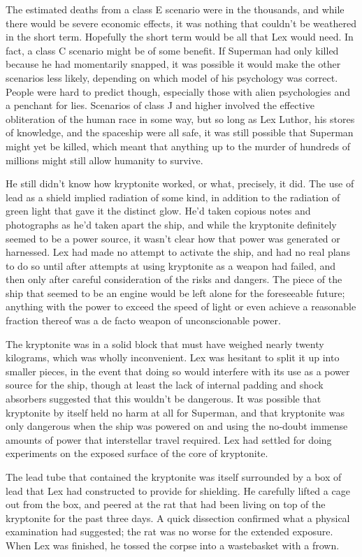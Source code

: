 The estimated deaths from a class E scenario were in the thousands, and
while there would be severe economic effects, it was nothing that
couldn't be weathered in the short term. Hopefully the short term would
be all that Lex would need. In fact, a class C scenario might be of some
benefit. If Superman had only killed because he had momentarily snapped,
it was possible it would make the other scenarios less likely, depending
on which model of his psychology was correct. People were hard to
predict though, especially those with alien psychologies and a penchant
for lies. Scenarios of class J and higher involved the effective
obliteration of the human race in some way, but so long as Lex Luthor,
his stores of knowledge, and the spaceship were all safe, it was still
possible that Superman might yet be killed, which meant that anything up
to the murder of hundreds of millions might still allow humanity to
survive.

He still didn't know how kryptonite worked, or what, precisely, it did.
The use of lead as a shield implied radiation of some kind, in addition
to the radiation of green light that gave it the distinct glow. He'd
taken copious notes and photographs as he'd taken apart the ship, and
while the kryptonite definitely seemed to be a power source, it wasn't
clear how that power was generated or harnessed. Lex had made no attempt
to activate the ship, and had no real plans to do so until after
attempts at using kryptonite as a weapon had failed, and then only after
careful consideration of the risks and dangers. The piece of the ship
that seemed to be an engine would be left alone for the foreseeable
future; anything with the power to exceed the speed of light or even
achieve a reasonable fraction thereof was a de facto weapon of
unconscionable power.

The kryptonite was in a solid block that must have weighed nearly twenty
kilograms, which was wholly inconvenient. Lex was hesitant to split it
up into smaller pieces, in the event that doing so would interfere with
its use as a power source for the ship, though at least the lack of
internal padding and shock absorbers suggested that this wouldn't be
dangerous. It was possible that kryptonite by itself held no harm at all
for Superman, and that kryptonite was only dangerous when the ship was
powered on and using the no‐doubt immense amounts of power that
interstellar travel required. Lex had settled for doing experiments on
the exposed surface of the core of kryptonite.

The lead tube that contained the kryptonite was itself surrounded by a
box of lead that Lex had constructed to provide for shielding. He
carefully lifted a cage out from the box, and peered at the rat that had
been living on top of the kryptonite for the past three days. A quick
dissection confirmed what a physical examination had suggested; the rat
was no worse for the extended exposure. When Lex was finished, he tossed
the corpse into a wastebasket with a frown.

